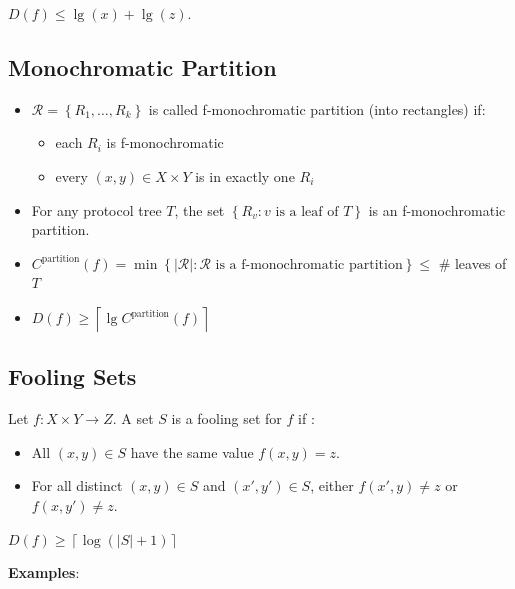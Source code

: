 \documentclass[10pt,landscape,a4paper]{article}
\newcommand{\set}[1]{\left \{ #1 \right \}}
\newcommand{\abs}[1]{\left | #1 \right |}
\newcommand{\ceil}[1]{\left \lceil #1 \right \rceil}
\begin{document}
\begin{multicols*}{3}
$D(f) \leq \lg(x) + \lg(z)$.

\subsection{Monochromatic Partition}

\begin{itemize}
    \item $\mathcal{R} = \set{R_1, \ldots, R_k}$ is called f-monochromatic partition (into rectangles) if:
    \begin{itemize}
        \item each $R_i$ is f-monochromatic
        \item every $(x, y) \in X \times Y$ is in exactly one $R_i$
    \end{itemize}
    \item For any protocol tree $T$, the set $\set{R_v: v \text{ is a leaf of } T}$ is an f-monochromatic partition.
    \item $C^{\text{partition}} (f) = \min \set{\abs{\mathcal{R}}: \mathcal{R} \text{ is a f-monochromatic partition}} \leq $ \# leaves of $T$
    \item $D(f) \geq \ceil{\lg{C^{\text{partition}} (f)}}$
\end{itemize}

\subsection{Fooling Sets}

Let $f: X \times Y \rightarrow Z$. A set $S$ is a fooling set for $f$ if :

\begin{itemize}
    \item All $(x, y) \in S$ have the same value $f(x, y) = z$.
    \item For all distinct $(x, y) \in S$ and $(x', y') \in S$, either $f(x', y) \neq z$ or $f(x, y') \neq z$.
\end{itemize}

$D(f) \geq \ceil{\log(\abs{S} + 1)}$

\textbf{Examples}:


\end{multicols*}
\end{document}
